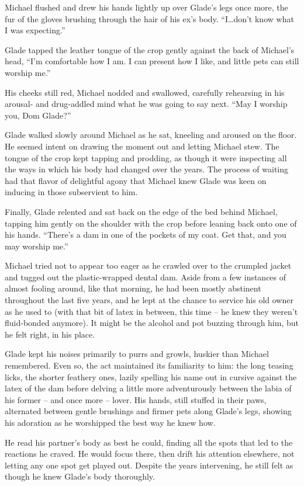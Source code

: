Michael flushed and drew his hands lightly up over Glade's legs once more, the fur of the gloves brushing through the hair of his ex's body.  ``I\ldots{}don't know what I was expecting.''

Glade tapped the leather tongue of the crop gently against the back of Michael's head, ``I'm comfortable how I am.  I can present how I like, and little pets can still worship me.''

His cheeks still red, Michael nodded and swallowed, carefully rehearsing in his arousal- and drug-addled mind what he was going to say next.  ``May I worship you, Dom Glade?''

Glade walked slowly around Michael as he sat, kneeling and aroused on the floor.  He seemed intent on drawing the moment out and letting Michael stew.  The tongue of the crop kept tapping and prodding, as though it were inspecting all the ways in which his body had changed over the years.  The process of waiting had that flavor of delightful agony that Michael knew Glade was keen on inducing in those subservient to him.

Finally, Glade relented and sat back on the edge of the bed behind Michael, tapping him gently on the shoulder with the crop before leaning back onto one of his hands.  ``There's a dam in one of the pockets of my coat.  Get that, and you may worship me.''

Michael tried not to appear too eager as he crawled over to the crumpled jacket and tugged out the plastic-wrapped dental dam.  Aside from a few instances of almost fooling around, like that morning, he had been mostly abstinent throughout the last five years, and he lept at the chance to service his old owner as he used to (with that bit of latex in between, this time -- he knew they weren't fluid-bonded anymore).  It might be the alcohol and pot buzzing through him, but he felt right, in his place.

Glade kept his noises primarily to purrs and growls, huskier than Michael remembered.  Even so, the act maintained its familiarity to him: the long teasing licks, the shorter feathery ones, lazily spelling his name out in cursive against the latex of the dam before delving a little more adventurously between the labia of his former -- and once more -- lover.  His hands, still stuffed in their paws, alternated between gentle brushings and firmer pets along Glade's legs, showing his adoration as he worshipped the best way he knew how.

He read his partner's body as best he could, finding all the spots that led to the reactions he craved.  He would focus there, then drift his attention elsewhere, not letting any one spot get played out.  Despite the years intervening, he still felt as though he knew Glade's body thoroughly.

